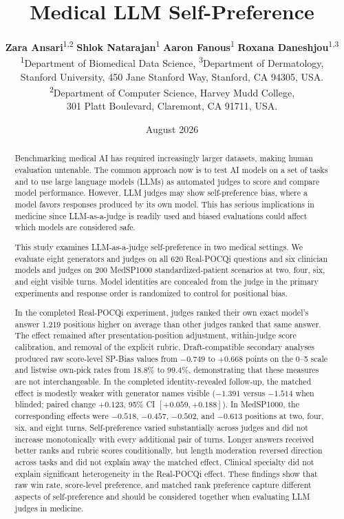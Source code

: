 \documentclass[11pt]{article}
\title{Medical LLM Self-Preference}
\author{
  \textbf{Zara Ansari}\textsuperscript{1,2}\quad
  \textbf{Shlok Natarajan}\textsuperscript{1}\quad
  \textbf{Aaron Fanous}\textsuperscript{1}\quad
  \textbf{Roxana Daneshjou}\textsuperscript{1,3}\\[0.8em]
  \small \textsuperscript{1}Department of Biomedical Data Science,
  \textsuperscript{3}Department of Dermatology,\\
  \small Stanford University, 450 Jane Stanford Way, Stanford, CA 94305, USA.\\
  \small \textsuperscript{2}Department of Computer Science, Harvey Mudd College,\\
  \small 301 Platt Boulevard, Claremont, CA 91711, USA.
}
\date{August 2026}
\begin{document}
\maketitle

\begin{abstract}
Benchmarking medical AI has required increasingly larger datasets, making
human evaluation untenable. The common approach now is to test AI models on a
set of tasks and to use large language models (LLMs) as automated judges to
score and compare model performance. However, LLM judges may show
self-preference bias, where a model favors responses produced by its own model.
This has serious implications in medicine since LLM-as-a-judge is readily used
and biased evaluations could affect which models are considered safe.

This study examines LLM-as-a-judge self-preference in two medical settings. We
evaluate eight generators and judges on all 620 Real-POCQi questions and six
clinician models and judges on 200 MedSP1000 standardized-patient scenarios at
two, four, six, and eight visible turns. Model identities are concealed from
the judge in the primary experiments and response order is randomized to
control for positional bias.

In the completed Real-POCQi experiment, judges ranked their own exact
model's answer 1.219 positions higher on average than other judges ranked that
same answer. The effect remained after presentation-position adjustment,
within-judge score calibration, and removal of the explicit rubric.
Draft-compatible secondary analyses produced raw score-level SP-Bias values
from $-0.749$ to $+0.668$ points on the 0--5 scale and listwise own-pick rates
from 18.8\% to 99.4\%, demonstrating that these measures are not
interchangeable. In the completed identity-revealed follow-up, the matched
effect is modestly weaker with generator names visible ($-1.391$ versus
$-1.514$ when blinded; paired change $+0.123$, 95\% CI $[+0.059,+0.188]$). In
MedSP1000, the corresponding effects were $-0.518$, $-0.457$, $-0.502$, and $-0.613$
positions at two, four, six, and eight turns. Self-preference varied
substantially across judges and did not increase monotonically with every
additional pair of turns. Longer answers received better ranks and rubric
scores conditionally, but length moderation reversed direction across tasks
and did not explain away the matched effect. Clinical specialty did not explain significant
heterogeneity in the Real-POCQi effect. These findings show that raw win rate,
score-level preference, and matched rank preference capture different aspects
of self-preference and should be considered together when evaluating LLM
judges in medicine.
\end{abstract}
\end{document}
